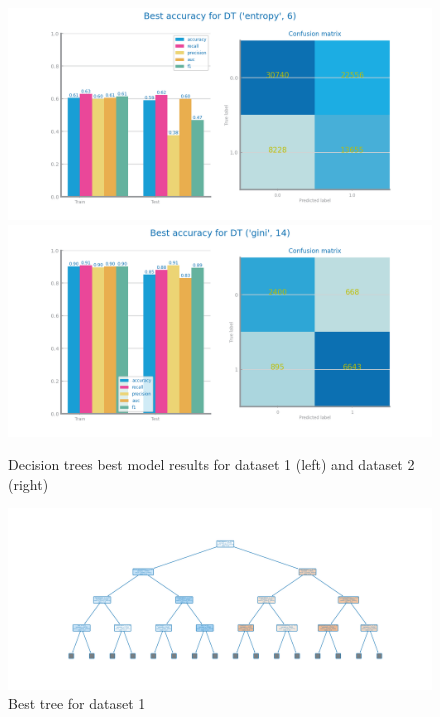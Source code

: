 \documentclass[10pt]{extarticle}
\begin{document}
\begin{figure}[H]
\centering\includegraphics[scale=0.4]{images/dataset1/models_evaluation/CovidPos_dt_DT_best_accuracy_eval.png}
\includegraphics[scale=0.4]{images/dataset2/models_evaluation/Credit_Score_DT_best_accuracy_eval.png}
\caption{Decision trees best model results for dataset 1 (left) and dataset 2 (right)}
\end{figure}

\begin{figure}[H]
\centering\includegraphics[scale=0.50]{images/dataset1/models_evaluation/CovidPos_dt_accuracy_best_tree.png}
\caption{Best tree for dataset 1}
\end{figure}
\end{document}
